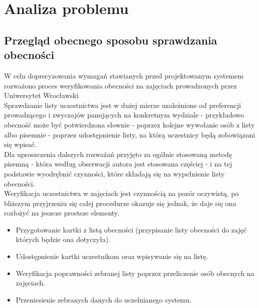 \documentclass[declaration,shortabstract, mgr]{iithesis}
\begin{document}
\chapter{Analiza problemu}
\section{Przegląd obecnego sposobu sprawdzania obecności}
\indent W celu doprecyzowania wymagań stawianych przed projektowanym systemem rozważono proces weryfikowania obecności na zajęciach prowadzonych przez Uniwersytet Wrocławski\\
\indent Sprawdzanie listy uczestnictwa jest w dużej mierze uzależnione od preferencji prowadzącego i zwyczajów panujących na konkretnym wydziale - przykładowo obecność może być potwierdzona słownie - poprzez kolejne wywołanie osób z listy albo pisemnie - poprzez udostępnienie listy, na którą uczestnicy będą zobowiązani się wpisać.\\
\indent Dla uproszczenia dalszych rozważań przyjęto za ogólnie stosowaną metodę pisemną - która według obserwacji autora jest stosowana częściej - i na tej podstawie wyodrębnić czynności, które składają się na wypełnienie listy obecności.\\
\indent Weryfikacja uczestnictwa w zajęciach jest czynnością na pozór oczywistą, po bliższym przyjrzeniu się całej procedurze okazuje się jednak, że daje się ona rozłożyć na jeszcze prostsze elementy. \\

\begin{itemize}
\item Przygotowanie kartki z listą obecności (przypisanie listy obecności do zajęć których będzie ona dotyczyła).
\item Udostępnienie kartki uczestnikom oraz wpisywanie się na listę.
\item Weryfikacja poprawności zebranej listy poprzez przeliczenie osób obecnych na zajęciach.
\item Przeniesienie zebranych danych do uczelnianego systemu.
\end{itemize}
\end{document}
